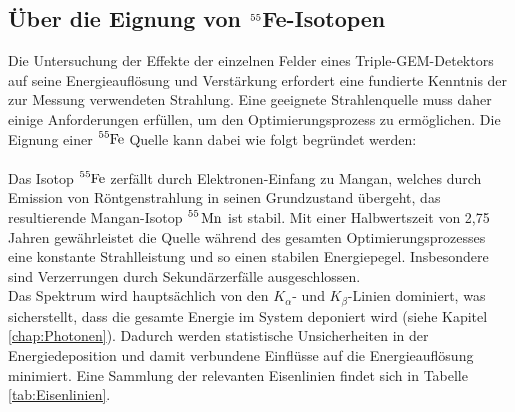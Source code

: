 		\subsection{Über die Eignung von $\ce{^{55}}$Fe-Isotopen}\label{sec:Fe55}
			Die Untersuchung der Effekte der einzelnen Felder eines Triple-GEM-Detektors auf seine Energieauflösung und Verstärkung erfordert eine fundierte Kenntnis der zur Messung verwendeten Strahlung. Eine geeignete Strahlenquelle muss daher einige Anforderungen erfüllen, um den Optimierungsprozess zu ermöglichen. Die Eignung einer  $\ce{^55Fe}$ Quelle kann dabei wie folgt begründet werden:\\
			\\
			Das Isotop $\ce{^55Fe}$ zerfällt durch Elektronen-Einfang zu Mangan, welches durch Emission von Röntgenstrahlung in seinen Grundzustand übergeht, das resultierende Mangan-Isotop $\ce{^55 Mn}$ ist stabil. Mit einer Halbwertszeit von 2,75 Jahren \cite{Half_Life_FE55} gewährleistet die Quelle während des gesamten Optimierungsprozesses eine konstante Strahlleistung und so einen stabilen Energiepegel. Insbesondere sind Verzerrungen durch Sekundärzerfälle ausgeschlossen.\\
			Das Spektrum wird hauptsächlich von den $K_{\alpha}$- und $K_{\beta}$-Linien dominiert, was sicherstellt, dass die gesamte Energie im System deponiert wird (siehe Kapitel \ref{chap:Photonen}). Dadurch werden statistische Unsicherheiten in der Energiedeposition und damit verbundene Einflüsse auf die Energieauflösung minimiert. Eine Sammlung der relevanten Eisenlinien findet sich in Tabelle \ref{tab:Eisenlinien}.
			

